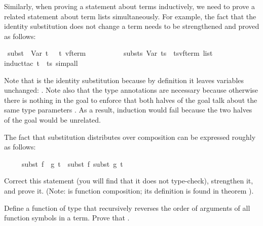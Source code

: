 \begin{isabellebody}
\begin{isamarkuptext}
Similarly, when proving a statement about terms inductively, we need
to prove a related statement about term lists simultaneously. For example,
the fact that the identity substitution does not change a term needs to be
strengthened and proved as follows:%
\end{isamarkuptext}%
\ {\isachardoublequote}subst\ \ Var\ t\ \ {\isacharequal}\ {\isacharparenleft}t\ {\isacharcolon}{\isacharcolon}{\isacharparenleft}{\isacharprime}v{\isacharcomma}{\isacharprime}f{\isacharparenright}term{\isacharparenright}\ \ {\isasymand}\isanewline
\ \ \ \ \ \ \ \ substs\ Var\ ts\ {\isacharequal}\ {\isacharparenleft}ts{\isacharcolon}{\isacharcolon}{\isacharparenleft}{\isacharprime}v{\isacharcomma}{\isacharprime}f{\isacharparenright}term\ list{\isacharparenright}{\isachardoublequote}\isanewline
{}induct{\isacharunderscore}tac\ t\ \ ts{\isacharcomma}\ simp{\isacharunderscore}all{\isacharparenright}\isanewline
{}%
\begin{isamarkuptext}%
\noindent
Note that  is the identity substitution because by definition it
leaves variables unchanged: . Note also
that the type annotations are necessary because otherwise there is nothing in
the goal to enforce that both halves of the goal talk about the same type
parameters . As a result, induction would fail
because the two halves of the goal would be unrelated.

\begin{exercise}
The fact that substitution distributes over composition can be expressed
roughly as follows:
\begin{isabelle}%
\ \ \ \ \ subst\ {\isacharparenleft}f\ {\isasymcirc}\ g{\isacharparenright}\ t\ {\isacharequal}\ subst\ f\ {\isacharparenleft}subst\ g\ t{\isacharparenright}%
\end{isabelle}
Correct this statement (you will find that it does not type-check),
strengthen it, and prove it. (Note: \isa{{\isasymcirc}} is function composition;
its definition is found in theorem ).
\end{exercise}
\begin{exercise}\label{ex:trev-trev}
  Define a function  of type 
that recursively reverses the order of arguments of all function symbols in a
  term. Prove that .
\end{exercise}


\end{isamarkuptext}
\end{isabellebody}
